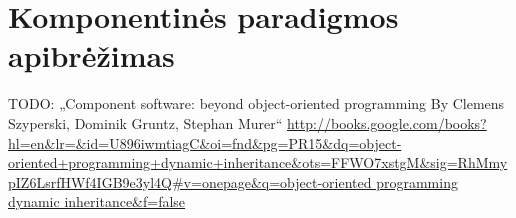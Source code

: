 \chapter{Komponentinės paradigmos apibrėžimas}

TODO: „Component software: beyond object-oriented programming By
Clemens Szyperski, Dominik Gruntz, Stephan Murer“
\url{http://books.google.com/books?hl=en&lr=&id=U896iwmtiagC&oi=fnd&pg=PR15&dq=object-oriented+programming+dynamic+inheritance&ots=FFWO7xstgM&sig=RhMmypIZ6LsrfHWf4IGB9e3yl4Q#v=onepage&q=object-oriented programming dynamic inheritance&f=false}
